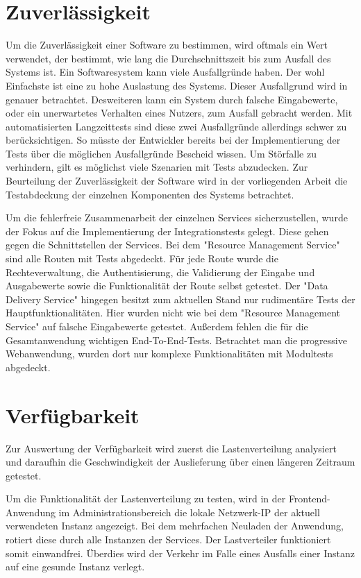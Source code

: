 \section{Zuverlässigkeit}
\label{sec:zuverlaessigkeit}
Um die Zuverlässigkeit einer Software zu bestimmen, wird oftmals ein Wert verwendet,
der bestimmt, wie lang die Durchschnittszeit bis zum Ausfall des Systems ist.\cite[S. 9]{SoftwareQualitaet}
Ein Softwaresystem kann viele Ausfallgründe haben. Der wohl Einfachste ist eine zu hohe Auslastung des Systems.
Dieser Ausfallgrund wird in  genauer betrachtet. Desweiteren kann ein System durch falsche
Eingabewerte, oder ein unerwartetes Verhalten eines Nutzers, zum Ausfall gebracht werden. Mit automatisierten Langzeittests
sind diese zwei Ausfallgründe allerdings schwer zu berücksichtigen. So müsste der Entwickler bereits bei der Implementierung
der Tests über die möglichen Ausfallgründe Bescheid wissen. Um Störfalle zu verhindern, gilt es möglichst viele Szenarien mit
Tests abzudecken. Zur Beurteilung der Zuverlässigkeit der Software wird in der vorliegenden Arbeit die
Testabdeckung der einzelnen Komponenten des Systems betrachtet.

Um die fehlerfreie Zusammenarbeit der einzelnen Services sicherzustellen,
wurde der Fokus auf die Implementierung der Integrationstests gelegt.
Diese gehen gegen die Schnittstellen der Services. Bei dem "Resource Management Service"
sind alle Routen mit Tests abgedeckt. Für jede Route wurde die Rechteverwaltung,
die Authentisierung, die Validierung der Eingabe und Ausgabewerte sowie die Funktionalität der Route selbst getestet.
Der "Data Delivery Service" hingegen besitzt zum aktuellen Stand nur rudimentäre Tests der Hauptfunktionalitäten.
Hier wurden nicht wie bei dem "Resource Management Service" auf falsche Eingabewerte getestet. Außerdem fehlen die für
die Gesamtanwendung wichtigen End-To-End-Tests. Betrachtet man die progressive Webanwendung, wurden dort nur komplexe
Funktionalitäten mit Modultests abgedeckt.

\section{Verfügbarkeit}
\label{sec:verfuegbarkeit}
Zur Auswertung der Verfügbarkeit wird zuerst die Lastenverteilung analysiert und daraufhin
die Geschwindigkeit der Auslieferung über einen längeren Zeitraum getestet.

Um die Funktionalität der Lastenverteilung zu testen, wird in der Frontend-Anwendung
im Administrationsbereich die lokale Netzwerk-IP der aktuell verwendeten Instanz
angezeigt. Bei dem mehrfachen Neuladen der Anwendung, rotiert diese
durch alle Instanzen der Services. Der Lastverteiler funktioniert somit einwandfrei.
Überdies wird der Verkehr im Falle eines Ausfalls einer Instanz auf eine gesunde
Instanz verlegt.


